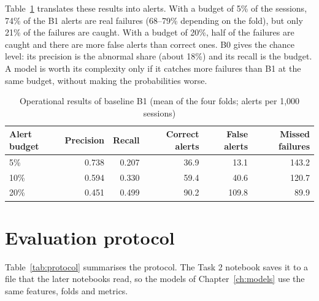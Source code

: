 \documentclass[12pt,a4paper,openany]{report}
\begin{document}
Table~\ref{tab:operational} translates these results into alerts. With a budget of 5\% of the sessions, 74\% of
the B1 alerts are real failures (68--79\% depending on the fold), but only 21\% of the failures are caught. With a
budget of 20\%, half of the failures are caught and there are more false alerts than correct ones. B0 gives the
chance level: its precision is the abnormal share (about 18\%) and its recall is the budget. A model is worth its complexity
only if it catches more failures than B1 at the same budget, without making the probabilities worse.

\begin{table}[!htb]
  \centering\small
  \caption{Operational results of baseline B1 (mean of the four folds; alerts per 1,000 sessions)}
  \label{tab:operational}
  \begin{tabular*}{0.9\textwidth}{@{\extracolsep{\fill}}lrrrrr}
    \toprule
    Alert budget & Precision & Recall & Correct alerts & False alerts & Missed failures \\
    \midrule
    5\%  & 0.738 & 0.207 & 36.9 & 13.1  & 143.2 \\
    10\% & 0.594 & 0.330 & 59.4 & 40.6  & 120.7 \\
    20\% & 0.451 & 0.499 & 90.2 & 109.8 & 89.9 \\
    \bottomrule
  \end{tabular*}
\end{table}

\section{Evaluation protocol}\label{sec:protocol}

Table~\ref{tab:protocol} summarises the protocol. The Task 2 notebook saves it to a file that the later notebooks
read, so the models of Chapter~\ref{ch:models} use the same features, folds and metrics.
\end{document}
